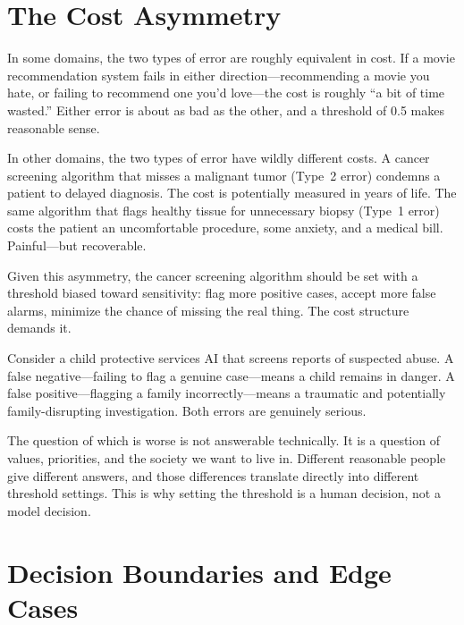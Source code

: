 \section{The Cost Asymmetry}

In some domains, the two types of error are roughly equivalent in cost. If a movie recommendation system fails in either direction---recommending a movie you hate, or failing to recommend one you'd love---the cost is roughly ``a bit of time wasted.'' Either error is about as bad as the other, and a threshold of 0.5 makes reasonable sense.

In other domains, the two types of error have wildly different costs. A cancer screening algorithm that misses a malignant tumor (Type~2 error) condemns a patient to delayed diagnosis. The cost is potentially measured in years of life. The same algorithm that flags healthy tissue for unnecessary biopsy (Type~1 error) costs the patient an uncomfortable procedure, some anxiety, and a medical bill. Painful---but recoverable.

Given this asymmetry, the cancer screening algorithm should be set with a threshold biased toward sensitivity: flag more positive cases, accept more false alarms, minimize the chance of missing the real thing. The cost structure demands it.

\begin{examplebox}
Consider a child protective services AI that screens reports of suspected abuse. A false negative---failing to flag a genuine case---means a child remains in danger. A false positive---flagging a family incorrectly---means a traumatic and potentially family-disrupting investigation. Both errors are genuinely serious.

The question of which is worse is not answerable technically. It is a question of values, priorities, and the society we want to live in. Different reasonable people give different answers, and those differences translate directly into different threshold settings. This is why setting the threshold is a human decision, not a model decision.
\end{examplebox}

\section{Decision Boundaries and Edge Cases}

